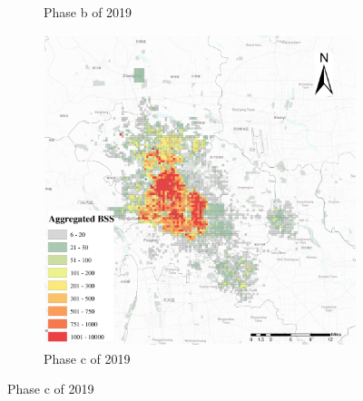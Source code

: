 \documentclass[preprints,ijgi,submit,moreauthors]{Definitions/mdpi}
\begin{document}
\begin{figure}[H]
\begin{subfigure}{.3\textwidth}
        \caption{Phase b of 2019}
    \end{subfigure}
    \begin{subfigure}{.3\textwidth}
        \includegraphics[width=\textwidth]{Figures/BSSPhase3_2019.eps}
        \caption{Phase c of 2019}
    \end{subfigure}
    

\end{figure}
\end{document}
